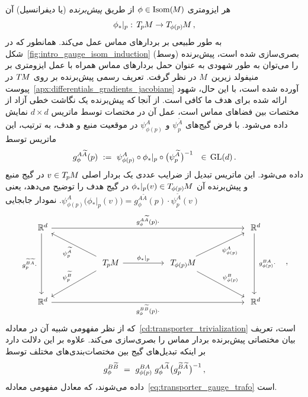 هر ایزومتری $\phi \in \operatorname{Isom}(\mkern-1.5mu M \mkern-.5mu)$ از طریق \emph{پیش‌برنده} (یا دیفرانسیل) آن
\begin{align}
	\phi_{*}|_p:\, \TpM \to \TphipM \,,
\end{align}
به طور طبیعی بر بردارهای مماس عمل می‌کند.
همانطور که در شکل~\ref{fig:intro_gauge_isom_induction} (وسط) بصری‌سازی شده است، پیش‌برنده را می‌توان به طور شهودی به عنوان حمل بردارهای مماس همراه با عمل ایزومتری بر منیفولد زیرین~$M$ در نظر گرفت.
تعریف رسمی پیش‌برنده بر روی $T\mkern-1.5muM$ در پیوست~\ref{apx:differentials_gradients_jacobians} آورده شده است، با این حال، شهود ارائه شده برای هدف ما کافی است.
از آنجا که پیش‌برنده یک نگاشت خطی آزاد از مختصات بین فضاهای مماس است، عمل آن در مختصات توسط ماتریس $d\times d$ نمایش داده می‌شود.
با فرض گیج‌های $\psi_p^{\widetilde{A}}$ و $\psi_{\phi(p)}^A$ در موقعیت منبع و هدف، به ترتیب، این ماتریس توسط
\begin{align}\label{eq:isom_induced_gauge_trafo_24}
	g_\phi^{A\widetilde{A}}(p)\ :=\ \psi_{\phi(p)}^A \circ \phi_*|_p \circ \big( \psi_p^{\widetilde{A}} \mkern1mu\big)^{-1} \ \ \in\, \operatorname{GL}(d) \,.
\end{align}
داده می‌شود.
این ماتریس تبدیل از ضرایب عددی یک بردار اصلی $v\in T_{\mkern-1.5mu p}\mkern-.5muM$ در گیج منبع و پیش‌برنده آن $\phi_*|_p(v) \in T_{\mkern-1.5mu \phi(p)}\mkern-1muM$ در گیج هدف را توضیح می‌دهد، یعنی
$\psi_{\phi(p)}^A \big( \phi_*|_p (v) \big) = g_\phi^{A\widetilde{A}}(p) \cdot \psi_p^{\widetilde{A}}(v)$.
نمودار جابجایی
\begin{equation}
	\begin{tikzcd}[column sep=54pt, row sep=28pt, font=\normalsize]
		\R^d
		\arrow[dd, "g_p^{\widetilde{B}\widetilde{A}}\cdot\ "']
		\arrow[rrr, "g_\phi^{A\widetilde{A}}(p)\cdot"]
		& &[-1ex] &
		\R^d
		\arrow[dd, "\ g_{\phi(p)}^{BA}\cdot"]
		\\
		&
		\TpM
		\arrow[ul, "\psi_p^{\widetilde{A}}"]
		\arrow[dl, "\psi_p^{\widetilde{B}}"']
		\arrow[r, "\phi_*|_p"]
		&
		\TphipM
		\arrow[ur, "\psi_{\phi(p)}^A"']
		\arrow[dr, "\psi_{\phi(p)}^B"]
		\\
		\R^d
		\arrow[rrr, "g_\phi^{B\widetilde{B}}(p)\cdot"']
		& & &
		\R^d
	\end{tikzcd}
	\quad,
\end{equation}
که از نظر مفهومی شبیه آن در معادله~\eqref{cd:transporter_trivialization} است، تعریف بیان مختصاتی پیش‌برنده بردار مماس را بصری‌سازی می‌کند.
علاوه بر این دلالت دارد بر اینکه تبدیل‌های گیج بین مختصات‌بندی‌های مختلف توسط
\begin{align}
	g_\phi^{B\widetilde{B}}
	\ =\ g_{\phi(p)}^{BA} \; g_\phi^{A\widetilde{A}} \mkern1mu \big(g_p^{\widetilde{B}\widetilde{A}} \mkern1mu\big)^{-1} \,,
\end{align}
داده می‌شوند، که معادل مفهومی معادله~\eqref{eq:transporter_gauge_trafo} است.










